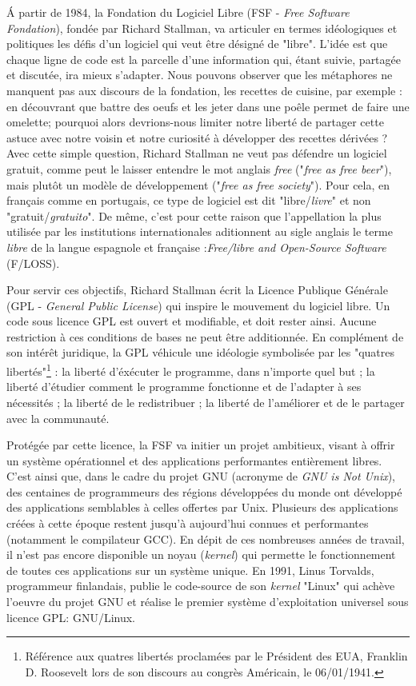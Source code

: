 \'A partir de 1984, la Fondation du Logiciel Libre (FSF - \emph{Free Software Fondation}), fondée par Richard Stallman, va articuler en termes idéologiques et politiques les défis d'un logiciel qui veut être désigné de "libre". L'idée est que chaque ligne de code est la parcelle d'une information qui, étant suivie, partagée et discutée, ira mieux s'adapter. Nous pouvons observer que les métaphores ne manquent pas aux discours de la fondation, les recettes de cuisine, par exemple : en découvrant que battre des oeufs et les jeter dans une poêle permet de faire une omelette; pourquoi alors devrions-nous limiter notre liberté de partager cette astuce avec notre voisin et notre curiosité à développer des recettes dérivées ? Avec cette simple question, Richard Stallman ne veut pas défendre un logiciel gratuit, comme peut le laisser entendre le mot anglais \emph{free} ("\emph{free as free beer}"), mais plutôt un modèle de développement ("\emph{free as free society}"). Pour cela, en français comme en portugais, ce type de logiciel est dit "libre/\emph{livre}" et non "gratuit/\emph{gratuito}". De même, c'est pour cette raison que l'appellation la plus utilisée par les institutions internationales aditionnent au sigle anglais le terme \emph{libre} de la langue espagnole et française :\emph{Free/libre and Open-Source Software} (F/LOSS).

Pour servir ces objectifs, Richard Stallman écrit la Licence Publique Générale (GPL - \emph{General Public License}) qui inspire le mouvement du logiciel libre. Un code sous licence GPL est ouvert et modifiable, et doit rester ainsi. Aucune restriction à ces conditions de bases ne peut être additionnée. En complément de son intérêt juridique, la GPL véhicule une idéologie symbolisée par les "quatres libertés"\footnote{Référence aux quatres libertés proclamées par le Président des EUA, Franklin D. Roosevelt lors de son discours au congrès Américain, le 06/01/1941.} : la liberté d'éxécuter le programme, dans n'importe quel but ; la liberté d'étudier comment le programme fonctionne et de l'adapter à ses nécessités ; la liberté de le redistribuer ; la liberté de l'améliorer et de le partager avec la communauté.

Protégée par cette licence, la FSF va initier un projet ambitieux, visant à offrir un système opérationnel et des applications performantes entièrement libres. C'est ainsi que, dans le cadre du projet GNU (acronyme de \emph{GNU is Not Unix}), des centaines de programmeurs des régions développées du monde ont développé des applications semblables à celles offertes par Unix. Plusieurs des applications créées à cette époque restent jusqu'à aujourd'hui connues et performantes (notamment le compilateur GCC). En dépit de ces nombreuses années de travail, il n'est pas encore disponible un noyau (\emph{kernel}) qui permette le fonctionnement de toutes ces applications sur un système unique. En 1991, Linus Torvalds, programmeur finlandais, publie le code-source de son \emph{kernel} "Linux" qui achève l'oeuvre du projet GNU et réalise le premier système d'exploitation universel sous licence GPL: GNU/Linux.

